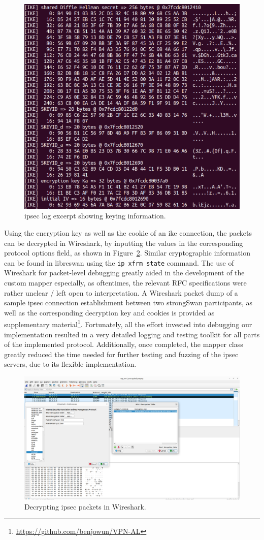 \begin{figure}
	\centering
	\includegraphics[width=0.7\linewidth]{images/key_material_log}
	\caption{\ac{ipsec} log excerpt showing keying information.}
	\label{fig:keymateriallog}
\end{figure}


Using the encryption key as well as the cookie of an \ac{ike} connection, the packets can be decrypted in Wireshark, by inputting the values in the corresponding protocol options field, as shown in Figure~\ref{fig:wiresharkdecryption}. Similar cryptographic information can be found in libreswan using the \texttt{ip xfrm state} command. The use of Wireshark for packet-level debugging greatly aided in the development of the custom mapper especially, as oftentimes, the relevant RFC specifications were rather unclear / left open to interpretation. A Wireshark packet dump of a sample \ac{ipsec} connection establishment between two strongSwan participants, as well as the corresponding decryption key and cookies is provided as supplementary material\footnote{\url{https://github.com/benjowun/VPN-AL}}. Fortunately, all the effort invested into debugging our implementation resulted in a very detailed logging and testing toolkit for all parts of the implemented protocol. Additionally, once completed, the mapper class greatly reduced the time needed for further testing and fuzzing of the \ac{ipsec} servers, due to its flexible implementation.

\begin{figure}
	\centering
	\includegraphics[width=\linewidth]{images/wireshark_decryption}
	\caption{Decrypting \ac{ipsec} packets in Wireshark.}
	\label{fig:wiresharkdecryption}
\end{figure}

